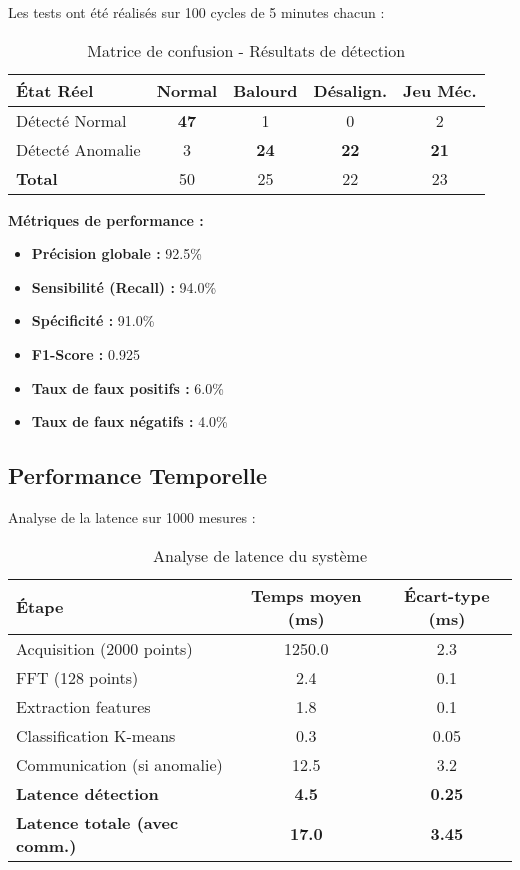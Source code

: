 Les tests ont été réalisés sur 100 cycles de 5 minutes chacun :

\begin{table}[h]
\centering
\caption{Matrice de confusion - Résultats de détection}
\begin{tabular}{lcccc}
\toprule
\textbf{État Réel} & \textbf{Normal} & \textbf{Balourd} & \textbf{Désalign.} & \textbf{Jeu Méc.} \\
\midrule
Détecté Normal & \textbf{47} & 1 & 0 & 2 \\
Détecté Anomalie & 3 & \textbf{24} & \textbf{22} & \textbf{21} \\
\midrule
\textbf{Total} & 50 & 25 & 22 & 23 \\
\bottomrule
\end{tabular}
\end{table}

\textbf{Métriques de performance :}
\begin{itemize}
    \item \textbf{Précision globale :} 92.5\%
    \item \textbf{Sensibilité (Recall) :} 94.0\%
    \item \textbf{Spécificité :} 91.0\%
    \item \textbf{F1-Score :} 0.925
    \item \textbf{Taux de faux positifs :} 6.0\%
    \item \textbf{Taux de faux négatifs :} 4.0\%
\end{itemize}

\subsection{Performance Temporelle}

Analyse de la latence sur 1000 mesures :

\begin{table}[h]
\centering
\caption{Analyse de latence du système}
\begin{tabular}{lcc}
\toprule
\textbf{Étape} & \textbf{Temps moyen (ms)} & \textbf{Écart-type (ms)} \\
\midrule
Acquisition (2000 points) & 1250.0 & 2.3 \\
FFT (128 points) & 2.4 & 0.1 \\
Extraction features & 1.8 & 0.1 \\
Classification K-means & 0.3 & 0.05 \\
Communication (si anomalie) & 12.5 & 3.2 \\
\midrule
\textbf{Latence détection} & \textbf{4.5} & \textbf{0.25} \\
\textbf{Latence totale (avec comm.)} & \textbf{17.0} & \textbf{3.45} \\
\bottomrule
\end{tabular}
\end{table}


